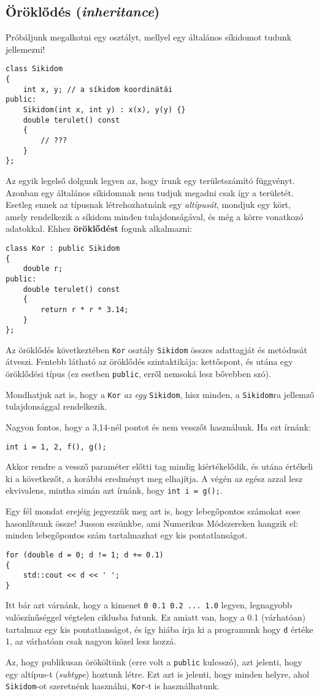 \documentclass[a4paper,11.5pt,table]{article}
\begin{document}
	\subsection{Öröklődés (\textit{inheritance})}
	Próbáljunk megalkotni egy osztályt, mellyel egy általános síkidomot tudunk jellemezni!
	\begin{lstlisting}
class Sikidom
{
	int x, y; // a síkidom koordinátái
public:
	Sikidom(int x, int y) : x(x), y(y) {}
	double terulet() const
	{
		// ???
	}
};
	\end{lstlisting}
	Az egyik legelső dolgunk legyen az, hogy írunk egy területszámító függvényt. Azonban egy általános síkidomnak nem tudjuk megadni csak így a területét. Esetleg ennek az típusnak létrehozhatnánk egy \textit{altípusát}, mondjuk egy kört, amely rendelkezik a síkidom minden tulajdonságával, és még a körre vonatkozó adatokkal. Ehhez \textbf{öröklődést} fogunk alkalmazni:
	\begin{lstlisting}
class Kor : public Sikidom
{
	double r;
public:
	double terulet() const
	{
		return r * r * 3.14;
	}
};
	\end{lstlisting}
	Az öröklődés következtében \texttt{Kor} osztály \texttt{Sikidom} összes adattagját és metódusát átveszi. Fentebb látható az öröklődés szintaktikája: kettőspont, és utána egy öröklődési típus (ez esetben \texttt{public}, erről nemsoká lesz bővebben szó).
	
	Mondhatjuk azt is, hogy a \texttt{Kor} \textit{az egy} \texttt{Sikidom}, hisz minden, a \texttt{Sikidom}ra jellemző tulajdonsággal rendelkezik.
	\begin{note}
		Nagyon fontos, hogy a 3,14-nél pontot és nem vesszőt használunk. Ha ezt írnánk:
		\begin{lstlisting}
int i = 1, 2, f(), g();
		\end{lstlisting}
		
		Akkor rendre a vessző paraméter előtti tag mindig kiértékelődik, és utána értékeli ki a következőt, a korábbi eredményt meg elhajítja. A végén az egész azzal lesz ekvivalens, mintha simán azt írnánk, hogy \texttt{int i = g();}.
		
		Egy fél mondat erejéig jegyezzük meg azt is, hogy lebegőpontos számokat sose hasonlítsunk össze! Jusson eszünkbe, ami Numerikus Módszereken hangzik el: minden lebegőpontos szám tartalmazhat egy kis pontatlanságot.
		\begin{lstlisting}
for (double d = 0; d != 1; d += 0.1)
{
	std::cout << d << ' ';
}
		\end{lstlisting}
		Itt bár azt várnánk, hogy a kimenet \texttt{0 0.1 0.2 ... 1.0} legyen, legnagyobb valószínűséggel végtelen ciklusba futunk. Ez amiatt van, hogy a 0.1 (várhatóan) tartalmaz egy kis pontatlanságot, és így hiába írja ki  a programunk hogy \texttt{d} értéke 1, az várhatóan csak nagyon közel lesz hozzá.
	\end{note}
	Az, hogy publikusan örököltünk (erre volt a \texttt{public} kulcsszó), azt jelenti, hogy egy {altípus}-t (\textit{subtype}) hoztunk létre. 
	Ezt azt is jelenti, hogy minden helyre, ahol \texttt{Sikidom}-ot szeretnénk használni, \texttt{Kor}-t is használhatunk.
	
\end{document}
